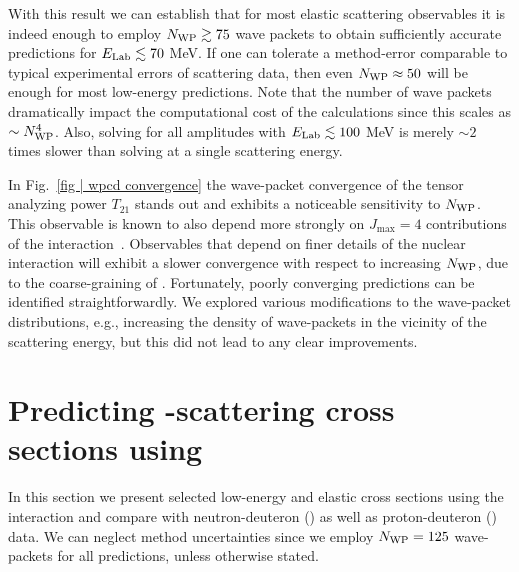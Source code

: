 \documentclass[aps,prc,showpacs,twocolumn,floatfix,nobibnotes,nofootinbib,amsmath,amssymb,longbibliography]{revtex4-2}
\begin{document}
With this result we can establish that for most elastic \nd{}
scattering observables it is indeed enough to employ $N_{\text{WP}}\gtrsim 75$
wave packets to obtain sufficiently accurate predictions for $E_\text{Lab}
\lesssim 70$ MeV. If one can tolerate a \wpcd{} method-error
comparable to typical experimental errors of \Nd{} scattering data,
then even $N_{\text{WP}} \approx 50$ will be enough for most low-energy \Nd{}
predictions. Note that the number of wave packets dramatically impact the
computational cost of the \wpcd{} calculations since this scales as
$\sim N_{\text{WP}}^4$. Also, solving for all amplitudes with $E_\text{Lab} \lesssim
100$ MeV is merely $\sim 2$ times slower than solving at a single
scattering energy.

In Fig.~\ref{fig | wpcd convergence} the wave-packet convergence of
the tensor analyzing power $T_{21}$ stands out and exhibits a
noticeable sensitivity to $N_{\text{WP}}$. This observable is known to also
depend more strongly on $J_\text{max}=4$ contributions of the \NN{}
interaction~\cite{Gloeckle:1995jg}. Observables that depend on finer
details of the nuclear interaction will exhibit a slower convergence
with respect to increasing $N_{\text{WP}}$, due to the coarse-graining of
\wpcd{}.  Fortunately, poorly converging predictions can be identified
straightforwardly. We explored various modifications to the
wave-packet distributions, e.g., increasing the density of
wave-packets in the vicinity of the scattering energy, but this did
not lead to any clear improvements.

\section{Predicting \nd{}-scattering cross sections using \NNLOopt{}}
\label{sec | low-energy predicions of nd-scattering cross sections}
In this section we present selected low-energy and elastic \nd{} cross
sections using the \NNLOopt{} \NN{} interaction and compare with
neutron-deuteron (\nd) as well as proton-deuteron (\pd) data. We can
neglect method uncertainties since we employ $N_{\text{WP}}=125$ wave-packets
for all predictions, unless otherwise stated.
\end{document}
